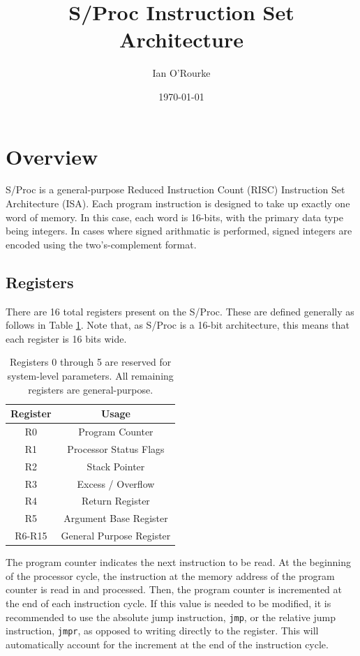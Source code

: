 \documentclass{article}
\title{S/Proc Instruction Set Architecture}
\author{Ian O'Rourke}
\date{\today \\ \titlelogoimage}
\begin{document}
\maketitle

\section{Overview}

S/Proc is a general-purpose Reduced Instruction Count (RISC) Instruction Set Architecture (ISA). Each program instruction is designed to take up exactly one word of memory. In this case, each word is 16-bits, with the primary data type being integers. In cases where signed arithmatic is performed, signed integers are encoded using the two's-complement format.

\subsection{Registers}

There are 16 total registers present on the S/Proc. These are defined generally as follows in Table \ref{table:register-setup}. Note that, as S/Proc is a 16-bit architecture, this means that each register is 16 bits wide.

\begin{table}[h!]
    \centering
    \begin{tabular}{c|c}
        \hline
        Register & Usage \\
        \hline
        R0 & Program Counter \\
        R1 & Processor Status Flags \\
        R2 & Stack Pointer \\
        R3 & Excess / Overflow \\
        R4 & Return Register \\
        R5 & Argument Base Register \\
        R6-R15 & General Purpose Register \\
        \hline
    \end{tabular}
    \caption{Registers 0 through 5 are reserved for system-level parameters. All remaining registers are general-purpose.}
    \label{table:register-setup}
\end{table}

The program counter indicates the next instruction to be read. At the beginning of the processor cycle, the instruction at the memory address of the program counter is read in and processed. Then, the program counter is incremented at the end of each instruction cycle. If this value is needed to be modified, it is recommended to use the absolute jump instruction, \texttt{jmp}, or the relative jump instruction, \texttt{jmpr}, as opposed to writing directly to the register. This will automatically account for the increment at the end of the instruction cycle.
\end{document}
